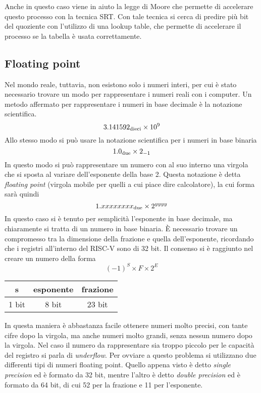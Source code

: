 \documentclass[a4paper,12pt]{article}
\theoremstyle{break}
\numberwithin{equation}{section}
\begin{document}
    Anche in questo caso viene in aiuto la legge di Moore che permette di accelerare questo processo con la tecnica SRT. Con tale tecnica si cerca di predire più bit del quoziente con l'utilizzo di una lookup table, che permette di accelerare il processo se la tabella è usata correttamente.
    \subsection{Floating point}
    Nel mondo reale, tuttavia, non esistono solo i numeri interi, per cui è stato necessario trovare un modo per rappresentare i numeri reali con i computer. Un metodo affermato per rappresentare i numeri in base decimale è la notazione scientifica.
    \[
        3.141592_{\mbox{\scriptsize dieci}} \times 10^9
    \]
    Allo stesso modo si può usare la notazione scientifica per i numeri in base binaria
    \[
        1.0_{\mbox{\scriptsize due}} \times 2_{-1}
    \]
    In questo modo si può rappresentare un numero con al suo interno una virgola che si sposta al variare dell'esponente della base 2. Questa notazione è detta \textit{floating point} (virgola mobile per quelli a cui piace dire calcolatore), la cui forma sarà quindi 
    \[
        1.xxxxxxxx_{\mbox{\scriptsize due}} \times 2^{yyyy}    
    \]
    In questo caso si è tenuto per semplicità l'esponente in base decimale, ma chiaramente si tratta di un numero in base binaria.
    È necessario trovare un compromesso tra la dimensione della frazione e quella dell'esponente, ricordando che i registri all'interno del RISC-V sono di 32 bit. Il consenso si è raggiunto nel creare un numero della forma 
    \[
        (-1)^S \times F \times 2^E
    \]
    \begin{center}
        \begin{tabular}{|c|c|c|}
            \hline
            s & esponente & frazione \\
            \hline
            \multicolumn{1}{c}{\normalsize 1 bit} & \multicolumn{1}{c}{\normalsize 8 bit} & \multicolumn{1}{c}{\normalsize 23 bit}        
        \end{tabular}
    \end{center}
    In questa maniera è abbastanza facile ottenere numeri molto precisi, con tante cifre dopo la virgola, ma anche numeri molto grandi, senza nessun numero dopo la virgola. Nel caso il numero da rappresentare sia troppo piccolo per le capacità del registro si parla di \textit{underflow}.
    Per ovviare a questo problema si utilizzano due differenti tipi di numeri floating point. Quello appena visto è detto \textit{single precision} ed è formato da 32 bit, mentre l'altro è detto \textit{double precision} ed è formato da 64 bit, di cui 52 per la frazione e 11 per l'esponente. 
\end{document}

